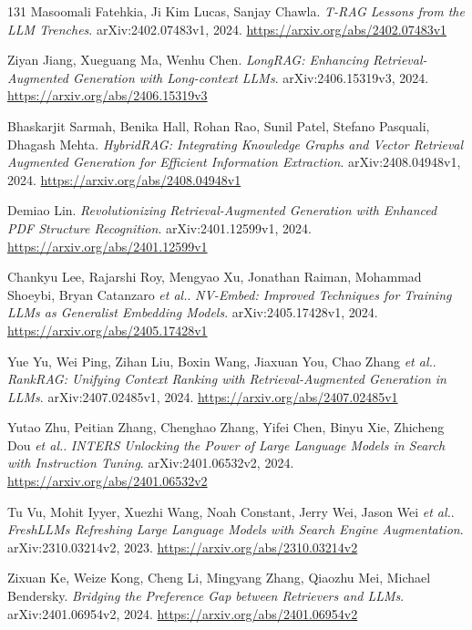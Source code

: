 \documentclass[11pt,a4paper]{article}
\begin{document}
\begin{thebibliography}{131}
Masoomali Fatehkia, Ji Kim Lucas, Sanjay Chawla.
\newblock \emph{T-RAG Lessons from the LLM Trenches}.
\newblock arXiv:2402.07483v1, 2024.
\newblock \url{https://arxiv.org/abs/2402.07483v1}

Ziyan Jiang, Xueguang Ma, Wenhu Chen.
\newblock \emph{LongRAG: Enhancing Retrieval-Augmented Generation with Long-context LLMs}.
\newblock arXiv:2406.15319v3, 2024.
\newblock \url{https://arxiv.org/abs/2406.15319v3}

Bhaskarjit Sarmah, Benika Hall, Rohan Rao, Sunil Patel, Stefano Pasquali, Dhagash Mehta.
\newblock \emph{HybridRAG: Integrating Knowledge Graphs and Vector Retrieval Augmented Generation for Efficient Information Extraction}.
\newblock arXiv:2408.04948v1, 2024.
\newblock \url{https://arxiv.org/abs/2408.04948v1}

Demiao Lin.
\newblock \emph{Revolutionizing Retrieval-Augmented Generation with Enhanced PDF Structure Recognition}.
\newblock arXiv:2401.12599v1, 2024.
\newblock \url{https://arxiv.org/abs/2401.12599v1}

Chankyu Lee, Rajarshi Roy, Mengyao Xu, Jonathan Raiman, Mohammad Shoeybi, Bryan Catanzaro \emph{et al.}.
\newblock \emph{NV-Embed: Improved Techniques for Training LLMs as Generalist Embedding Models}.
\newblock arXiv:2405.17428v1, 2024.
\newblock \url{https://arxiv.org/abs/2405.17428v1}

Yue Yu, Wei Ping, Zihan Liu, Boxin Wang, Jiaxuan You, Chao Zhang \emph{et al.}.
\newblock \emph{RankRAG: Unifying Context Ranking with Retrieval-Augmented Generation in LLMs}.
\newblock arXiv:2407.02485v1, 2024.
\newblock \url{https://arxiv.org/abs/2407.02485v1}

Yutao Zhu, Peitian Zhang, Chenghao Zhang, Yifei Chen, Binyu Xie, Zhicheng Dou \emph{et al.}.
\newblock \emph{INTERS Unlocking the Power of Large Language Models in Search with Instruction Tuning}.
\newblock arXiv:2401.06532v2, 2024.
\newblock \url{https://arxiv.org/abs/2401.06532v2}

Tu Vu, Mohit Iyyer, Xuezhi Wang, Noah Constant, Jerry Wei, Jason Wei \emph{et al.}.
\newblock \emph{FreshLLMs Refreshing Large Language Models with Search Engine Augmentation}.
\newblock arXiv:2310.03214v2, 2023.
\newblock \url{https://arxiv.org/abs/2310.03214v2}

Zixuan Ke, Weize Kong, Cheng Li, Mingyang Zhang, Qiaozhu Mei, Michael Bendersky.
\newblock \emph{Bridging the Preference Gap between Retrievers and LLMs}.
\newblock arXiv:2401.06954v2, 2024.
\newblock \url{https://arxiv.org/abs/2401.06954v2}


\end{thebibliography}
\end{document}
